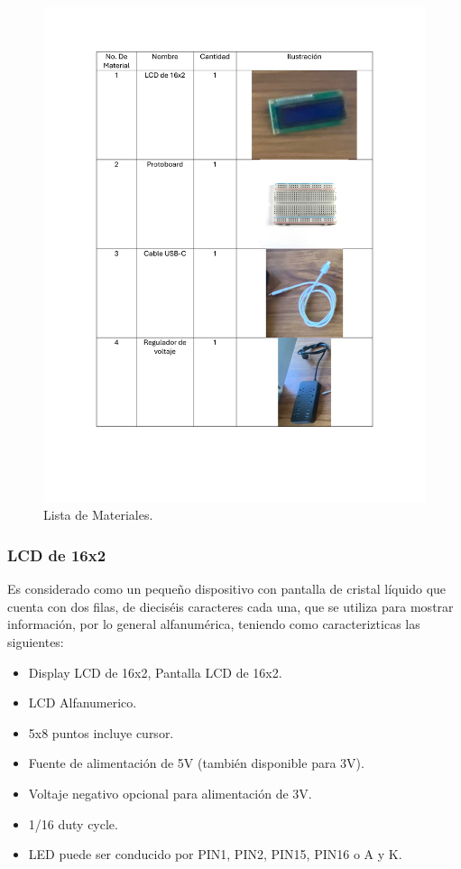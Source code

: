     \begin{figure}[H]
        \centering
        \includegraphics[scale=0.2] {15/img/listaDeMateriales.pdf}
        \caption{Lista de Materiales.}
        \label{fig:listaDeMateriales}
    \end{figure}
    
    \subsubsection{LCD de 16x2}
    Es considerado como un pequeño dispositivo con pantalla de cristal líquido que cuenta con dos filas, de dieciséis caracteres cada una, que se utiliza para mostrar información, por lo general alfanumérica, teniendo como caracterizticas las siguientes: 
    
    \begin{itemize}
        \item Display LCD de 16x2, Pantalla LCD de 16x2.
        \item LCD Alfanumerico.
        \item 5x8 puntos incluye cursor.
        \item Fuente de alimentación de 5V (también disponible para 3V).
        \item Voltaje negativo opcional para alimentación de 3V.
        \item 1/16 duty cycle.
        \item LED puede ser conducido por PIN1, PIN2, PIN15, PIN16 o A y K.
        
    \end{itemize}
    
